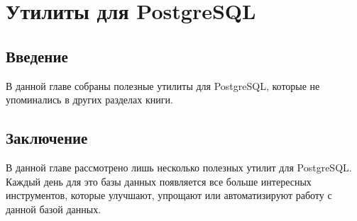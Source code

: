 \chapter{Утилиты для PostgreSQL}

\begin{epigraphs}
\end{epigraphs}

\section{Введение}

В данной главе собраны полезные утилиты для PostgreSQL, которые не упоминались в других разделах книги.







\section{Заключение}

В данной главе рассмотрено лишь несколько полезных утилит для PostgreSQL. Каждый день для это базы данных появляется все больше интересных инструментов, которые улучшают, упрощают или автоматизируют работу с данной базой данных.
